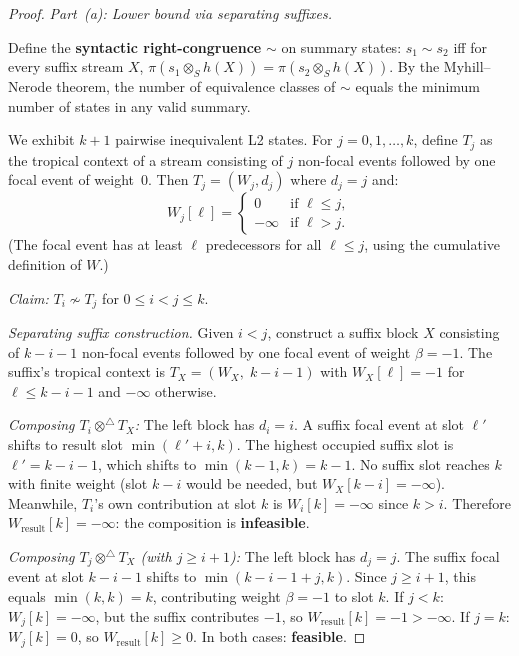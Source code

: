\documentclass[11pt]{article}
\theoremstyle{plain}
\theoremstyle{definition}
\theoremstyle{remark}
\newcommand{\optrop}{\otimes^{\triangle}}
\begin{document}
\begin{proof}
\emph{Part~(a): Lower bound via separating suffixes.}

Define the \textbf{syntactic right-congruence} $\sim$ on summary
states: $s_1 \sim s_2$ iff for every suffix stream $X$,
$\pi(s_1 \otimes_S h(X)) = \pi(s_2 \otimes_S h(X))$.  By the
Myhill--Nerode theorem, the number of equivalence classes of $\sim$
equals the minimum number of states in any valid summary.

We exhibit $k+1$ pairwise inequivalent L2 states.  For
$j = 0, 1, \ldots, k$, define $T_j$ as the tropical context of a
stream consisting of $j$ non-focal events followed by one focal event
of weight~$0$.  Then $T_j = (W_j, d_j)$ where $d_j = j$ and:
\[
  W_j[\ell] = \begin{cases}
    0 & \text{if } \ell \le j,\\
    -\infty & \text{if } \ell > j.
  \end{cases}
\]
(The focal event has at least $\ell$ predecessors for all $\ell \le j$,
using the cumulative definition of $W$.)

\emph{Claim:} $T_i \not\sim T_j$ for $0 \le i < j \le k$.

\emph{Separating suffix construction.}
Given $i < j$, construct a suffix block $X$ consisting of $k - i - 1$
non-focal events followed by one focal event of weight $\beta = -1$.
The suffix's tropical context is $T_X = (W_X,\; k{-}i{-}1)$ with
$W_X[\ell] = -1$ for $\ell \le k - i - 1$ and $-\infty$ otherwise.

\emph{Composing $T_i \optrop T_X$:}  The left block has $d_i = i$.
A suffix focal event at slot $\ell'$ shifts to result slot
$\min(\ell' + i, k)$.  The highest occupied suffix slot is
$\ell' = k - i - 1$, which shifts to $\min(k - 1, k) = k - 1$.
No suffix slot reaches $k$ with finite weight (slot $k - i$ would be
needed, but $W_X[k-i] = -\infty$).  Meanwhile, $T_i$'s own
contribution at slot $k$ is $W_i[k] = -\infty$ since $k > i$.
Therefore $W_{\mathrm{result}}[k] = -\infty$: the composition is
\textbf{infeasible}.

\emph{Composing $T_j \optrop T_X$ (with $j \ge i + 1$):}  The left
block has $d_j = j$.  The suffix focal event at slot $k - i - 1$
shifts to $\min(k - i - 1 + j, k)$.  Since $j \ge i + 1$, this equals
$\min(k, k) = k$, contributing weight $\beta = -1$ to slot $k$.
If $j < k$: $W_j[k] = -\infty$, but the suffix contributes $-1$, so
$W_{\mathrm{result}}[k] = -1 > -\infty$.
If $j = k$: $W_j[k] = 0$, so $W_{\mathrm{result}}[k] \ge 0$.
In both cases: \textbf{feasible}.


\end{proof}
\end{document}
